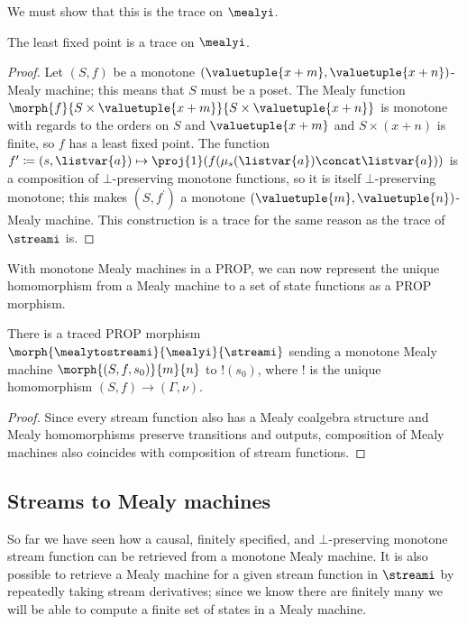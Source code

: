 We must show that this is the trace on \(\mealyi\).

\begin{proposition}
    The least fixed point is a trace on \(\mealyi\).
\end{proposition}
\begin{proof}
    Let \((S, f)\) be a monotone
    \((\valuetuple{x+m}, \valuetuple{x+n})\)-Mealy machine; this means that
    \(S\) must be a poset.
    The Mealy function \(
    \morph{f}{
        S \times \valuetuple{x+m}
    }{
        S \times \valuetuple{x+n}
    }
    \) is monotone with regards to the orders on \(S\) and
    \(\valuetuple{x+m}\) and \(S \times (x+n)\) is finite, so
    \(f\) has a least fixed point.
    The function \(
    f^\prime \coloneqq (s, \listvar{a})
    \mapsto
    \proj{1}\mleft(f(\mu_{s}(\listvar{a}) \concat \listvar{a})\mright)
    \) is a composition of \(\bot\)-preserving monotone functions, so it is
    itself \(\bot\)-preserving monotone; this makes \((S, f^\prime)\) a monotone
    \((\valuetuple{m}, \valuetuple{n})\)-Mealy machine.
    This construction is a trace for the same reason as the trace of
    \(\streami\) is.
\end{proof}

With monotone Mealy machines in a PROP, we can now represent the unique
homomorphism from a Mealy machine to a set of state functions as a PROP
morphism.

\begin{proposition}\label{prop:mealy-to-stream}
    There is a traced PROP morphism
    \(\morph{\mealytostreami}{\mealyi}{\streami}\) sending a monotone Mealy
    machine \(\morph{\left(S, f, s_0\right)}{m}{n}\) to \(!(s_0)\), where \(!\)
    is the unique homomorphism \((S,f) \to (\Gamma,\nu)\).
\end{proposition}
\begin{proof}
    Since every stream function also has a Mealy coalgebra structure and Mealy
    homomorphisms preserve transitions and outputs,
    composition of Mealy machines also coincides with composition of stream
    functions.
\end{proof}

\subsection{Streams to Mealy machines}

So far we have seen how a causal, finitely specified, and \(\bot\)-preserving
monotone stream function can be retrieved from a monotone Mealy machine.
It is also possible to retrieve a Mealy machine for a given stream function in
\(\streami\) by repeatedly taking stream derivatives; since we know there are
finitely many we will be able to compute a finite set of states in a Mealy
machine.

